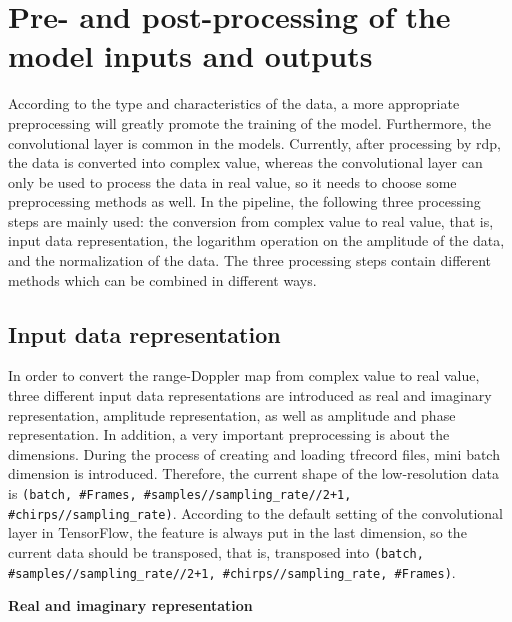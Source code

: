 \section{Pre- and post-processing of the model inputs and outputs} \label{pre- and post-processing of the model inputs and outputs}

According to the type and characteristics of the data, a more appropriate preprocessing will greatly promote the training of the model. Furthermore, the convolutional layer is common in the models. Currently, after processing by \gls{rdp}, the data is converted into complex value, whereas the convolutional layer can only be used to process the data in real value, so it needs to choose some preprocessing methods as well. In the pipeline, the following three processing steps are mainly used: the conversion from complex value to real value, that is, input data representation, the logarithm operation on the amplitude of the data, and the normalization of the data. The three processing steps contain different methods which can be combined in different ways.

\subsection{Input data representation} \label{separation types}
In order to convert the range-Doppler map from complex value to real value, three different input data representations are introduced as real and imaginary representation, amplitude representation, as well as amplitude and phase representation. In addition, a very important preprocessing is about the dimensions. During the process of creating and loading \gls{tfrecord} files, mini batch dimension is introduced. Therefore, the current shape of the low-resolution data is \texttt{(batch, \#Frames, \#samples//sampling\_rate//2+1, \#chirps//sampling\_rate)}. According to the default setting of the convolutional layer in TensorFlow, the feature is always put in the last dimension, so the current data should be transposed, that is, transposed into \texttt{(batch, \#samples//sampling\_rate//2+1, \#chirps//sampling\_rate, \#Frames)}.

\begin{spacing}{1.5}
\textbf{\large{Real and imaginary representation}}
\end{spacing}

